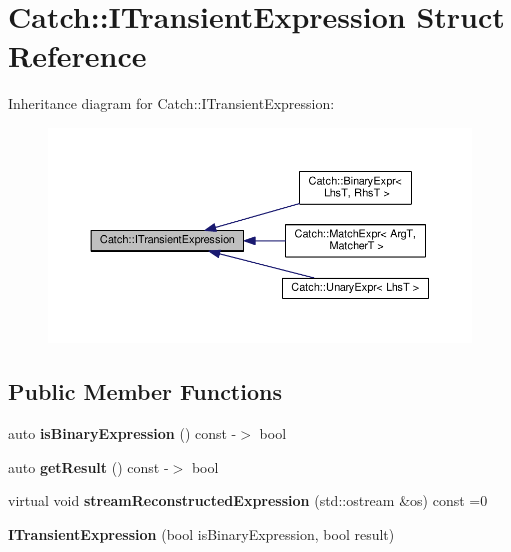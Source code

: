 \hypertarget{structCatch_1_1ITransientExpression}{}\section{Catch\+:\+:I\+Transient\+Expression Struct Reference}
\label{structCatch_1_1ITransientExpression}


Inheritance diagram for Catch\+:\+:I\+Transient\+Expression\+:\nopagebreak
\begin{figure}[H]
\begin{center}
\leavevmode
\includegraphics[width=350pt]{structCatch_1_1ITransientExpression__inherit__graph}
\end{center}
\end{figure}
\subsection*{Public Member Functions}
\begin{DoxyCompactItemize}
\item 
auto {\bfseries is\+Binary\+Expression} () const -\/$>$ bool\hypertarget{structCatch_1_1ITransientExpression_a3b436e13a0a6d3522bbf70d4e31deb22}{}\label{structCatch_1_1ITransientExpression_a3b436e13a0a6d3522bbf70d4e31deb22}

\item 
auto {\bfseries get\+Result} () const -\/$>$ bool\hypertarget{structCatch_1_1ITransientExpression_a101c7db86c87eff93a8ff496720e6320}{}\label{structCatch_1_1ITransientExpression_a101c7db86c87eff93a8ff496720e6320}

\item 
virtual void {\bfseries stream\+Reconstructed\+Expression} (std\+::ostream \&os) const =0\hypertarget{structCatch_1_1ITransientExpression_aabe1889df9c6e639a24afb08d8a0fe9e}{}\label{structCatch_1_1ITransientExpression_aabe1889df9c6e639a24afb08d8a0fe9e}

\item 
{\bfseries I\+Transient\+Expression} (bool is\+Binary\+Expression, bool result)\hypertarget{structCatch_1_1ITransientExpression_aafe69572b7ed884e63ec81f58d4afd8c}{}\label{structCatch_1_1ITransientExpression_aafe69572b7ed884e63ec81f58d4afd8c}

\end{DoxyCompactItemize}
